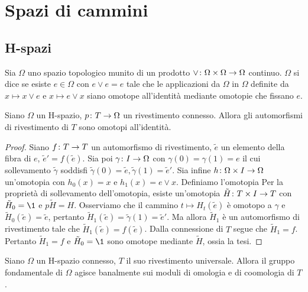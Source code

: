 \chapter{Spazi di cammini}
\label{ch:path-spaces}
\section{H-spazi}
\begin{definition}
Sia \(\Omega\) uno spazio topologico munito di un prodotto \(\map{\vee}{\Omega\times \Omega}{\Omega}\) continuo. \(\Omega\) si dice  se esiste \(e\in \Omega\) con \(e\vee e=e\) tale che le applicazioni da \(\Omega\) in \(\Omega\) definite da \(x\mapsto x\vee e\) e \(x\mapsto e\vee x\) siano omotope all'identità mediante omotopie che fissano \(e\).
\end{definition}
\begin{proposition}
Siano \(\Omega\) un H-spazio, \(\map{p}{T}{\Omega}\) un rivestimento connesso. Allora gli automorfismi di rivestimento di \(T\) sono omotopi all'identità.
\end{proposition}
\begin{proof}
Siano \(\map{f}{T}{T}\) un automorfismo di rivestimento, \(\tilde{e}\) un elemento della fibra di \(e\), \(\tilde{e}'=f(\tilde{e})\). Sia poi \(\map{\gamma}{I}{\Omega}\) con \(\gamma(0)=\gamma(1)=e\) il cui sollevamento \(\tilde\gamma\) soddisfi \(\tilde\gamma(0)=\tilde{e},\tilde\gamma(1)=\tilde{e}'\). Sia infine \(\map{h}{\Omega\times I}{\Omega}\) un'omotopia con \(h_0(x)=x\) e \(h_1(x)=e\vee x\). Definiamo l'omotopia
Per la proprietà di sollevamento dell'omotopia, esiste un'omotopia \(\map{\tilde{H}}{T\times I}{T}\) con \(\tilde{H}_0=\1\) e \(p\tilde{H}=H\). Osserviamo che il cammino \(t\mapsto H_t(\tilde{e})\) è omotopo a \(\gamma\) e \(\tilde{H}_0(\tilde{e})=\tilde{e}\), pertanto \(\tilde{H}_1(\tilde{e})=\tilde{\gamma}(1)=\tilde{e}'\). Ma allora \(\tilde{H}_1\) è un automorfismo di rivestimento tale che \(\tilde{H}_1(\tilde{e})=f(\tilde{e})\). Dalla connessione di \(T\) segue che \(\tilde{H}_1=f\). Pertanto \(\tilde{H}_1=f\) e \(\tilde{H}_0=\1\) sono omotope mediante \(\tilde H\), ossia la tesi.
\end{proof}
\begin{corollary}
Siano \(\Omega\) un H-spazio connesso, \(T\) il suo rivestimento universale. Allora il gruppo fondamentale di \(\Omega\) agisce banalmente sui moduli di omologia e di coomologia di \(T\).
\end{corollary}

